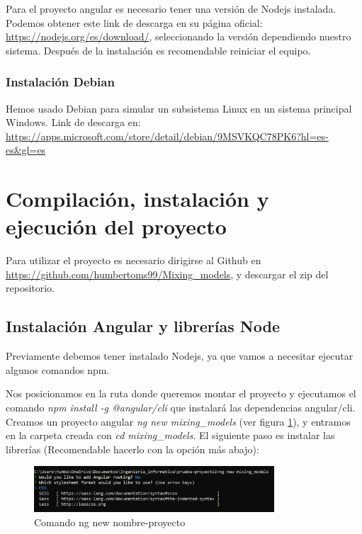 Para el proyecto angular es necesario tener una versión de Nodejs instalada. Podemos obtener este link de descarga en su página oficial: \url{https://nodejs.org/es/download/}, seleccionando la versión dependiendo nuestro sistema. Después de la instalación es recomendable reiniciar el equipo.

\subsubsection{Instalación Debian}

Hemos usado Debian para simular un subsistema Linux en un sistema principal Windows. Link de descarga en: \url{https://apps.microsoft.com/store/detail/debian/9MSVKQC78PK6?hl=es-es&gl=es}


\section{Compilación, instalación y ejecución del proyecto}

Para utilizar el proyecto es necesario dirigirse al Github en \url{https://github.com/humbertoms99/Mixing_models}, y descargar el zip del repositorio.

\subsection{Instalación Angular y librerías Node}

Previamente debemos tener instalado Nodejs, ya que vamos a necesitar ejecutar algunos comandos npm.

Nos posicionamos en la ruta donde queremos montar el proyecto y ejecutamos el comando \textit{npm install -g @angular/cli} que instalará las dependencias angular/cli.
Creamos un proyecto angular \textit{ng new mixing\_models} (ver figura \ref{fig:ng_new}), y entramos en la carpeta creada con \textit{cd mixing\_models}. El siguiente paso es instalar las librerías (Recomendable hacerlo con la opción más abajo): \\


\begin{figure}[h!] 
\centering
    \includegraphics[width=0.8\textwidth]{img/ng_new.PNG}
\caption{Comando ng new nombre-proyecto}
\label{fig:ng_new}
\end{figure}

